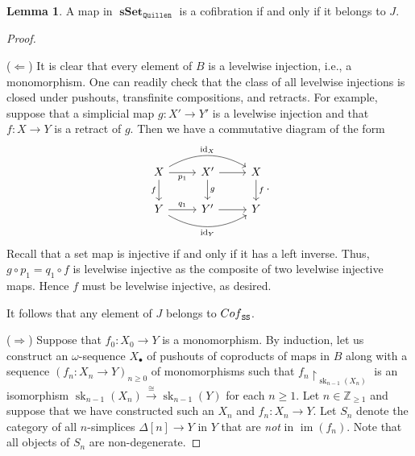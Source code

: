 \documentclass[10pt,letterpaper,cm]{nupset}
\theoremstyle{definition}
\theoremstyle{theorem}
\newtheorem{lemma}[definition]{Lemma}
\theoremstyle{remark}
\newcommand{\Z}{\mathbb Z}
\DeclareMathOperator{\im}{im}
\newcommand{\0}{\mathbf{0}}
\newcommand{\1}{\mathbf{1}}
\newcommand{\2}{\mathbf{2}}
\DeclareMathOperator{\sset}{\mathbf{sSet}}
\DeclareMathOperator{\sk}{sk}
\DeclareMathOperator{\idd}{id}
\DeclareMathOperator{\cof}{\mathnormal{Cof}}
\begin{document}
\begin{lemma}\label{cofJ}
A map in $\sset_{\mathtt{Quillen}}$ is a cofibration if and only if it belongs to $J$.
\end{lemma}
\begin{proof} $ $
\smallskip

($\Longleftarrow$) It is clear that every element of $B$ is a levelwise injection, i.e., a monomorphism. One can readily check that the class of all levelwise injections is closed under pushouts, transfinite compositions, and retracts. For example, suppose that a simplicial map $g : X' \to Y'$ is a levelwise injection and that $f: X \to Y$ is a retract of $g$. Then we have a commutative diagram of the form
\[
\begin{tikzcd}
X \arrow[d, "f"'] \arrow[r, "p_1"'] \arrow[rr, "\idd_X", bend left] & X' \arrow[d, "g"] \arrow[r] & X \arrow[d, "f"] \\
Y \arrow[r, "q_1"] \arrow[rr, "\idd_Y"', bend right]                & Y' \arrow[r]                 & Y               
\end{tikzcd}.
\] Recall that a set map is injective if and only if it has a left inverse. Thus, $g \circ p_1 = q_1 \circ f$ is levelwise injective as the composite of two levelwise injective maps.  Hence $f$ must be levelwise injective, as desired.

\smallskip

It follows that any element of $J$ belongs to $\cof_{\mathtt{SS}}$.

\medskip

($\Longrightarrow$) Suppose that $f_0 : X_0 \to Y$ is a monomorphism. By induction, let us construct an $\omega$-sequence $X_{\bullet}$ of pushouts of coproducts of maps in $B$ along with a sequence $\left(f_n : X_n \to Y\right)_{n \geq 0}$ of monomorphisms such that  $f_n\restriction_{\sk_{n-1}(X_n)}$ is an isomorphism $\sk_{n-1}(X_n) \overset{\cong}{\longrightarrow} \sk_{n-1}(Y)$ for each $n\geq 1$. Let $n\in \Z_{\geq 1}$ and suppose that we have constructed such an $X_n$ and $f_n : X_n \to Y$.  Let $S_n$ denote the category of all $n$-simplices $\Delta[n] \to Y$ in $Y$ that are \emph{not} in $\im(f_n)$. Note that all objects of $S_n$ are non-degenerate.


\end{proof}
\end{document}
